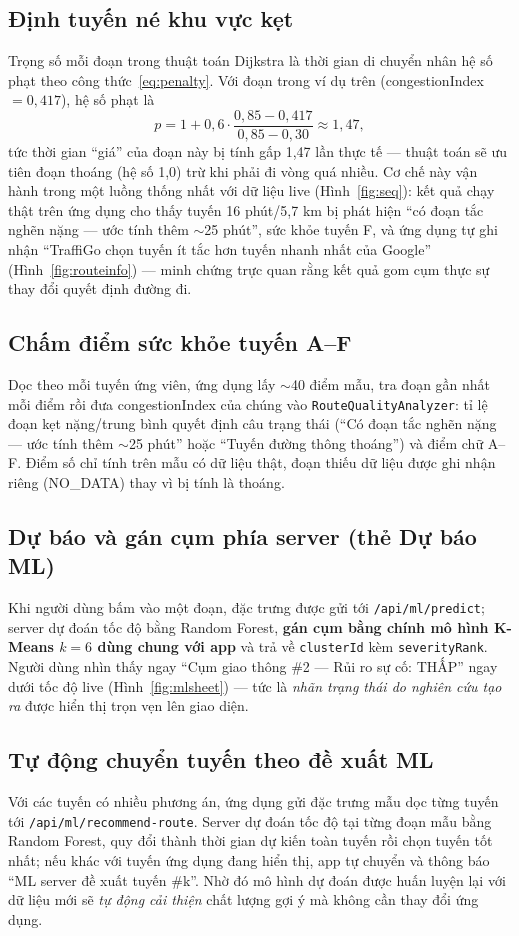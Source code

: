 \subsection{Định tuyến né khu vực kẹt}
Trọng số mỗi đoạn trong thuật toán Dijkstra là thời gian di chuyển nhân hệ số phạt theo công thức~\eqref{eq:penalty}. Với đoạn trong ví dụ trên (congestionIndex $= 0{,}417$), hệ số phạt là
\[
p = 1 + 0{,}6 \cdot \frac{0{,}85 - 0{,}417}{0{,}85 - 0{,}30} \approx 1{,}47,
\]
tức thời gian ``giá'' của đoạn này bị tính gấp 1{,}47 lần thực tế --- thuật toán sẽ ưu tiên đoạn thoáng (hệ số 1{,}0) trừ khi phải đi vòng quá nhiều. Cơ chế này vận hành trong một luồng thống nhất với dữ liệu live (Hình~\ref{fig:seq}): kết quả chạy thật trên ứng dụng cho thấy tuyến 16 phút/5{,}7 km bị phát hiện ``có đoạn tắc nghẽn nặng --- ước tính thêm $\sim$25 phút'', sức khỏe tuyến F, và ứng dụng tự ghi nhận ``TraffiGo chọn tuyến ít tắc hơn tuyến nhanh nhất của Google'' (Hình~\ref{fig:routeinfo}) --- minh chứng trực quan rằng kết quả gom cụm thực sự thay đổi quyết định đường đi.

\subsection{Chấm điểm sức khỏe tuyến A--F}
Dọc theo mỗi tuyến ứng viên, ứng dụng lấy $\sim$40 điểm mẫu, tra đoạn gần nhất mỗi điểm rồi đưa congestionIndex của chúng vào \texttt{RouteQualityAnalyzer}: tỉ lệ đoạn kẹt nặng/trung bình quyết định câu trạng thái (``Có đoạn tắc nghẽn nặng --- ước tính thêm $\sim$25 phút'' hoặc ``Tuyến đường thông thoáng'') và điểm chữ A--F. Điểm số chỉ tính trên mẫu có dữ liệu thật, đoạn thiếu dữ liệu được ghi nhận riêng (NO\_DATA) thay vì bị tính là thoáng.

\subsection{Dự báo và gán cụm phía server (thẻ Dự báo ML)}
Khi người dùng bấm vào một đoạn, đặc trưng được gửi tới \texttt{/api/ml/predict}; server dự đoán tốc độ bằng Random Forest, \textbf{gán cụm bằng chính mô hình K-Means $k=6$ dùng chung với app} và trả về \texttt{clusterId} kèm \texttt{severityRank}. Người dùng nhìn thấy ngay ``Cụm giao thông \#2 --- Rủi ro sự cố: THẤP'' ngay dưới tốc độ live (Hình~\ref{fig:mlsheet}) --- tức là \textit{nhãn trạng thái do nghiên cứu tạo ra} được hiển thị trọn vẹn lên giao diện.

\subsection{Tự động chuyển tuyến theo đề xuất ML}
Với các tuyến có nhiều phương án, ứng dụng gửi đặc trưng mẫu dọc từng tuyến tới \texttt{/api/ml/recommend-route}. Server dự đoán tốc độ tại từng đoạn mẫu bằng Random Forest, quy đổi thành thời gian dự kiến toàn tuyến rồi chọn tuyến tốt nhất; nếu khác với tuyến ứng dụng đang hiển thị, app tự chuyển và thông báo ``ML server đề xuất tuyến \#k''. Nhờ đó mô hình dự đoán được huấn luyện lại với dữ liệu mới sẽ \textit{tự động cải thiện} chất lượng gợi ý mà không cần thay đổi ứng dụng.

